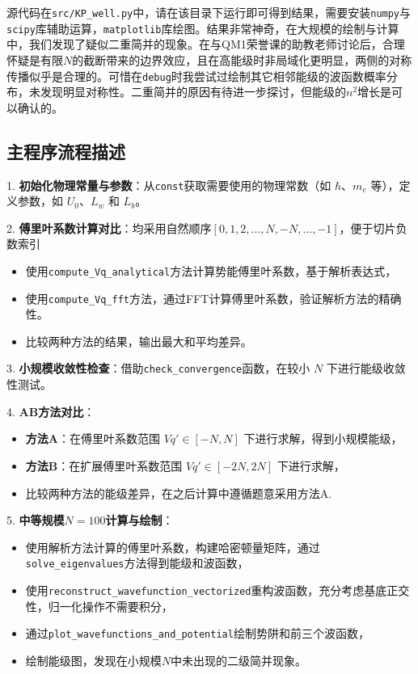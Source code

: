 源代码在\texttt{src/KP\_well.py}中，请在该目录下运行即可得到结果，需要安装\texttt{numpy}与\texttt{scipy}库辅助运算，\texttt{matplotlib}库绘图。结果非常神奇，在大规模的绘制与计算中，我们发现了疑似二重简并的现象。在与QM1荣誉课的助教老师讨论后，合理怀疑是有限$N$的截断带来的边界效应，且在高能级时非局域化更明显，两侧的对称传播似乎是合理的。可惜在\texttt{debug}时我尝试过绘制其它相邻能级的波函数概率分布，未发现明显对称性。二重简并的原因有待进一步探讨，但能级的$n^2$增长是可以确认的。

\subsection*{主程序流程描述}

1. \textbf{初始化物理常量与参数}：从\texttt{const}获取需要使用的物理常数（如 $\hbar$、$m_e$ 等），定义参数，如 $U_0$、$L_w$ 和 $L_b$。
   
2. \textbf{傅里叶系数计算对比}：均采用自然顺序$[0,1,2,\dots,N,-N,\dots,-1]$，便于切片负数索引
   \begin{itemize}
       \item 使用\texttt{compute\_Vq\_analytical}方法计算势能傅里叶系数，基于解析表达式，
       \item 使用\texttt{compute\_Vq\_fft}方法，通过FFT计算傅里叶系数，验证解析方法的精确性。
       \item 比较两种方法的结果，输出最大和平均差异。
   \end{itemize}
   
3. \textbf{小规模收敛性检查}：借助\texttt{check\_convergence}函数，在较小 $N$ 下进行能级收敛性测试。

4. \textbf{AB方法对比}：
   \begin{itemize}
       \item \textbf{方法A}：在傅里叶系数范围 $Vq' \in [-N, N]$ 下进行求解，得到小规模能级，
       \item \textbf{方法B}：在扩展傅里叶系数范围 $Vq' \in [-2N, 2N]$ 下进行求解，
       \item 比较两种方法的能级差异，在之后计算中遵循题意采用方法A.
   \end{itemize}

5. \textbf{中等规模$N=100$计算与绘制}：
   \begin{itemize}
       \item 使用解析方法计算的傅里叶系数，构建哈密顿量矩阵，通过\texttt{solve\_eigenvalues}方法得到能级和波函数，
       \item 使用\texttt{reconstruct\_wavefunction\_vectorized}重构波函数，充分考虑基底正交性，归一化操作不需要积分，
       \item 通过\texttt{plot\_wavefunctions\_and\_potential}绘制势阱和前三个波函数，
       \item 绘制能级图，发现在小规模$N$中未出现的二级简并现象。
   \end{itemize}

